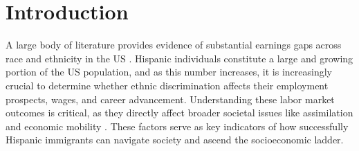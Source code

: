 
\section{Introduction}

A large body of literature provides evidence of substantial earnings gaps across race and ethnicity in the US \autocite{bayer2018divergent, charles2008prejudice}. Hispanic individuals constitute a large and growing portion of the US population, and as this number increases, it is increasingly crucial to determine whether ethnic discrimination affects their employment prospects, wages, and career advancement. Understanding these labor market outcomes is critical, as they directly affect broader societal issues like assimilation and economic mobility 
\autocite{chettyUnitedStatesStill2014, chettyEffectsExposureBetter2016,chettyFadingAmericanDream2017}. These factors serve as key indicators of how successfully Hispanic immigrants can navigate society and ascend the socioeconomic ladder.

